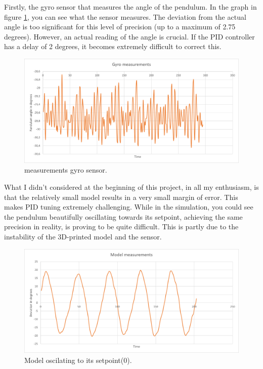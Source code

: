 \documentclass{article}
\begin{document}
\begin{multicols}{2}
Firstly, the gyro sensor that measures the angle of the pendulum. In the graph in figure \ref{fig:measurements gyro sensor}, you can see what the sensor measures. The deviation from the actual angle is too significant for this level of precision (up to a maximum of 2.75 degrees). However, an actual reading of the angle is crucial. If the PID controller has a delay of 2 degrees, it becomes extremely difficult to correct this.

\begin{figure}[H]
\centering
\includegraphics[scale=0.37]{Gyro meting}
\caption{measurements gyro sensor.}
\label{fig:measurements gyro sensor}
\end{figure}

What I didn't considered at the beginning of this project, in all my enthusiasm, is that the relatively small model results in a very small margin of error. This makes PID tuning extremely challenging. While in the simulation, you could see the pendulum beautifully oscillating towards its setpoint, achieving the same precision in reality, is proving to be quite difficult. This is partly due to the instability of the 3D-printed model and the sensor.

\begin{figure}[H]
\centering
\includegraphics[scale=0.37]{Model Oscilating}
\caption{Model oscilating to its setpoint(0).}
\label{fig:Model oscilating to its setpoint(0)}
\end{figure}


\end{multicols}
\end{document}
